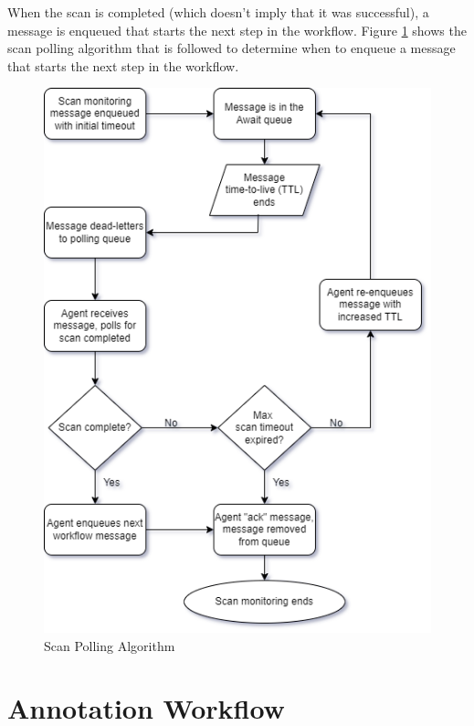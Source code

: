 When the scan is completed (which doesn't imply that it was successful), a message
is enqueued that starts the next step in the workflow.  
Figure \ref{fig:polling-flowchart} shows the scan polling algorithm that is followed
to determine when to enqueue a message that starts the next step in the workflow.

\begin{figure}[h]
    \includegraphics[width=\textwidth, scale=.75]{graphics/cxoneflow-diagrams-Polling Algorithm.png}
    \caption{Scan Polling Algorithm}
    \label{fig:polling-flowchart}
\end{figure}

\section{Annotation Workflow}\label{sec:annotation-workflow}

